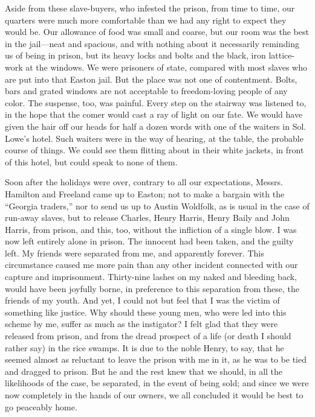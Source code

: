Aside from these slave-buyers, who infested the
{\protect\hypertarget{300}{}{}}prison, from time to time, our quarters
were much more comfortable than we had any right to expect they would
be. Our allowance of food was small and coarse, but our room was the
best in the jail---neat and spacious, and with nothing about it
necessarily reminding us of being in prison, but its heavy locks and
bolts and the black, iron lattice-work at the windows. We were prisoners
of state, compared with most slaves who are put into that Easton jail.
But the place was not one of contentment. Bolts, bars and grated windows
are not acceptable to freedom-loving people of any color. The suspense,
too, was painful. Every step on the stairway was listened to, in the
hope that the comer would cast a ray of light on our fate. We would have
given the hair off our heads for half a dozen words with one of the
waiters in Sol. Lowe's hotel. Such waiters were in the way of hearing,
at the table, the probable course of things. We could see them flitting
about in their white jackets, in front of this hotel, but could speak to
none of them.

Soon after the holidays were over, contrary to all our expectations,
Messrs. Hamilton and Freeland came up to Easton; not to make a bargain
with the ``Georgia traders,'' nor to send us up to Austin Woldfolk, as
is usual in the case of run-away slaves, but to release Charles, Henry
Harris, Henry Baily and John Harris, from prison, and this, too, without
the infliction of a single blow. I was now left entirely alone in
prison. The innocent had been taken, and the guilty left. My friends
were separated from me, and apparently forever. This circumstance caused
me {\protect\hypertarget{301}{}{}}more pain than any other incident
connected with our capture and imprisonment. Thirty-nine lashes on my
naked and bleeding back, would have been joyfully borne, in preference
to this separation from these, the friends of my youth. And yet, I could
not but feel that I was the victim of something like justice. Why should
these young men, who were led into this scheme by me, suffer as much as
the instigator? I felt glad that they were released from prison, and
from the dread prospect of a life (or death I should rather say) in the
rice swamps. It is due to the noble Henry, to say, that he seemed almost
as reluctant to leave the prison with me in it, as he was to be tied and
dragged to prison. But he and the rest knew that we should, in all the
likelihoods of the case, be separated, in the event of being sold; and
since we were now completely in the hands of our owners, we all
concluded it would be best to go peaceably home.


